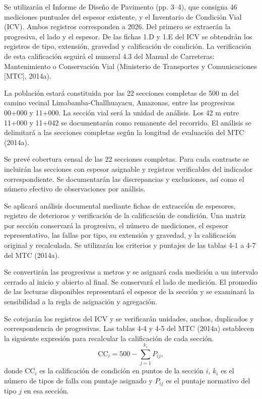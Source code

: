 \documentclass[12pt,a4paper]{article}
\begin{document}
Se utilizarán el Informe de Diseño de Pavimento (pp. 3–4), que consigna 46 mediciones puntuales del espesor existente, y el Inventario de Condición Vial (ICV). Ambos registros corresponden a 2026. Del primero se extraerán la progresiva, el lado y el espesor. De las fichas 1.D y 1.E del ICV se obtendrán los registros de tipo, extensión, gravedad y calificación de condición. La verificación de esta calificación seguirá el numeral 4.3 del Manual de Carreteras: Mantenimiento o Conservación Vial (Ministerio de Transportes y Comunicaciones [MTC], 2014a).

La población estará constituida por las 22 secciones completas de 500 m del camino vecinal Limabamba-Challhuayacu, Amazonas, entre las progresivas 00+000 y 11+000. La sección vial será la unidad de análisis. Los 42 m entre 11+000 y 11+042 se documentarán como remanente del recorrido. El análisis se delimitará a las secciones completas según la longitud de evaluación del MTC (2014a).

Se prevé cobertura censal de las 22 secciones completas. Para cada contraste se incluirán las secciones con espesor asignable y registros verificables del indicador correspondiente. Se documentarán las discrepancias y exclusiones, así como el número efectivo de observaciones por análisis.

Se aplicará análisis documental mediante fichas de extracción de espesores, registro de deterioros y verificación de la calificación de condición. Una matriz por sección conservará la progresiva, el número de mediciones, el espesor representativo, las fallas por tipo, su extensión y gravedad, y la calificación original y recalculada. Se utilizarán los criterios y puntajes de las tablas 4-1 a 4-7 del MTC (2014a).

Se convertirán las progresivas a metros y se asignará cada medición a un intervalo cerrado al inicio y abierto al final. Se conservará el lado de medición. El promedio de las lecturas disponibles representará el espesor de la sección y se examinará la sensibilidad a la regla de asignación y agregación.

Se cotejarán los registros del ICV y se verificarán unidades, anchos, duplicados y correspondencia de progresivas. Las tablas 4-4 y 4-5 del MTC (2014a) establecen la siguiente expresión para recalcular la calificación de cada sección.
\[
  \mathrm{CC}_{i}=500-\sum_{j=1}^{k_i}P_{ij},
\]
donde \(\mathrm{CC}_{i}\) es la calificación de condición en puntos de la sección \(i\), \(k_i\) es el número de tipos de falla con puntaje asignado y \(P_{ij}\) es el puntaje normativo del tipo \(j\) en esa sección.
\end{document}
